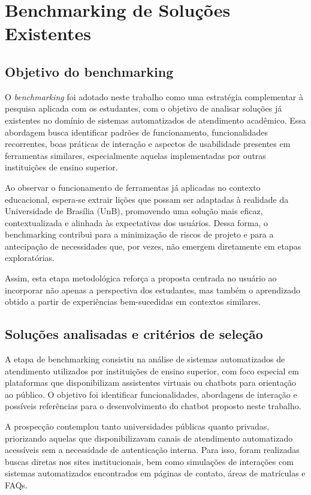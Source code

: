 \section{Benchmarking de Soluções Existentes}

\subsection{Objetivo do benchmarking}

O \textit{benchmarking} foi adotado neste trabalho como uma estratégia complementar à pesquisa aplicada com os estudantes, com o objetivo de analisar soluções já existentes no domínio de sistemas automatizados de atendimento acadêmico. Essa abordagem busca identificar padrões de funcionamento, funcionalidades recorrentes, boas práticas de interação e aspectos de usabilidade presentes em ferramentas similares, especialmente aquelas implementadas por outras instituições de ensino superior.

Ao observar o funcionamento de ferramentas já aplicadas no contexto educacional, espera-se extrair lições que possam ser adaptadas à realidade da Universidade de Brasília (UnB), promovendo uma solução mais eficaz, contextualizada e alinhada às expectativas dos usuários. Dessa forma, o benchmarking contribui para a minimização de riscos de projeto e para a antecipação de necessidades que, por vezes, não emergem diretamente em etapas exploratórias.

Assim, esta etapa metodológica reforça a proposta centrada no usuário ao incorporar não apenas a perspectiva dos estudantes, mas também o aprendizado obtido a partir de experiências bem-sucedidas em contextos similares.

\subsection{Soluções analisadas e critérios de seleção}

A etapa de benchmarking consistiu na análise de sistemas automatizados de atendimento utilizados por instituições de ensino superior, com foco especial em plataformas que disponibilizam assistentes virtuais ou chatbots para orientação ao público. O objetivo foi identificar funcionalidades, abordagens de interação e possíveis referências para o desenvolvimento do chatbot proposto neste trabalho.

A prospecção contemplou tanto universidades públicas quanto privadas, priorizando aquelas que disponibilizavam canais de atendimento automatizado acessíveis sem a necessidade de autenticação interna. Para isso, foram realizadas buscas diretas nos sites institucionais, bem como simulações de interações com sistemas automatizados encontrados em páginas de contato, áreas de matrículas e FAQs.

